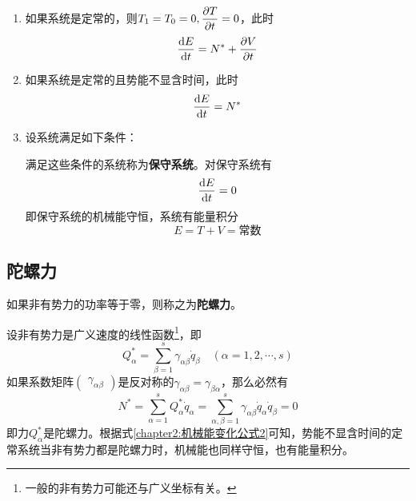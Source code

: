 \begin{enumerate}
\item 如果系统是定常的，则$T_1=T_0=0, \dfrac{\partial T}{\partial t} = 0$，此时
\begin{equation}
	\frac{\mathrm{d} E}{\mathrm{d} t} = N^* + \frac{\partial V}{\partial t}
\end{equation}
\item 如果系统是定常的且势能不显含时间，此时
\begin{equation}
	\frac{\mathrm{d} E}{\mathrm{d} t} = N^*
	\label{chapter2:机械能变化公式2}
\end{equation}
\item 设系统满足如下条件：满足这些条件的系统称为{\bf 保守系统}。对保守系统有
\begin{equation}
	\frac{\mathrm{d} E}{\mathrm{d} t} = 0
\end{equation}
即保守系统的机械能守恒，系统有能量积分
\begin{equation}
	E = T+V = \text{常数}
\end{equation}
\end{enumerate}

\subsection{陀螺力}

如果非有势力的功率等于零，则称之为{\bf 陀螺力}。

设非有势力是广义速度的线性函数\footnote{一般的非有势力可能还与广义坐标有关。}，即
\begin{equation*}
	Q_\alpha^* = \sum_{\beta=1}^s \gamma_{\alpha\beta}\dot{q}_\beta\quad (\alpha=1,2,\cdots,s)
\end{equation*}
如果系数矩阵$\begin{pmatrix} \gamma_{\alpha\beta} \end{pmatrix}$是反对称的$\gamma_{\alpha\beta}=\gamma_{\beta\alpha}$，那么必然有
\begin{equation*}
	N^* = \sum_{\alpha=1}^s Q_\alpha^*\dot{q}_\alpha = \sum_{\alpha,\beta=1}^s \gamma_{\alpha\beta} \dot{q}_\alpha\dot{q}_\beta = 0
\end{equation*}
即力$Q_\alpha^*$是陀螺力。根据式\eqref{chapter2:机械能变化公式2}可知，势能不显含时间的定常系统当非有势力都是陀螺力时，机械能也同样守恒，也有能量积分。

